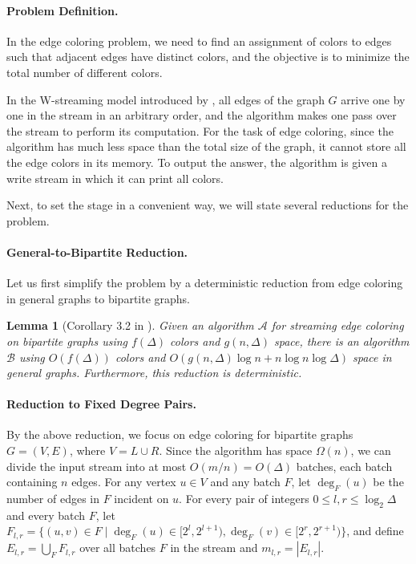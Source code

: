 \documentclass[11pt,a4paper]{article}
\newtheorem{lemma}{Lemma}[section]
\newcommand{\brac}[1]{\left(#1\right)}
\begin{document}
\paragraph*{Problem Definition.} In the edge coloring problem, we need to find an assignment of colors to edges such that adjacent edges have distinct colors, and the objective is to minimize the total number of different colors.

In the W-streaming model introduced by \cite{demetrescu2009trading,glazik2017finding}, all edges of the graph $G$ arrive one by one in the stream in an arbitrary order, and the algorithm makes one pass over the stream to perform its computation. For the task of edge coloring, since the algorithm has much less space than the total size of the graph, it cannot store all the edge colors in its memory. To output the answer, the algorithm is given a write stream in which it can print all colors.

Next, to set the stage in a convenient way, we will state several reductions for the problem.

\paragraph*{General-to-Bipartite Reduction.} Let us first simplify the problem by a deterministic reduction from edge coloring in general graphs to bipartite graphs.
\begin{lemma}[Corollary 3.2 in \cite{ghosh2024low}]
	Given an algorithm $\mathcal{A}$ for streaming edge coloring on bipartite graphs using $f(\Delta)$ colors and $g(n, \Delta)$ space, there is an algorithm $\mathcal{B}$ using $O(f(\Delta))$ colors and $O\brac{g(n, \Delta)\log n + n\log n\log\Delta}$ space in general graphs. Furthermore, this reduction is deterministic.
\end{lemma}

\paragraph*{Reduction to Fixed Degree Pairs.} By the above reduction, we focus on edge coloring for bipartite graphs $G = (V, E)$, where $V = L \cup R$. Since the algorithm has space $\Omega(n)$, we can divide the input stream into at most $ O(m / n) = O(\Delta) $ batches, each batch containing $n$ edges. For any vertex $u\in V$ and any batch $F$, let $\deg_F(u)$ be the number of edges in $F$ incident on $u$. For every pair of integers $0\leq l, r\leq \log_2\Delta$ and every batch $F$, let $F_{l, r} = \{(u, v)\in F\mid \deg_F(u)\in [2^l, 2^{l+1}), \deg_F(v) \in [2^r, 2^{r+1})\}$, and define $E_{l, r} = \bigcup_{F}F_{l, r}$ over all batches $F$ in the stream and $m_{l, r} = |E_{l, r}|$.
\end{document}
